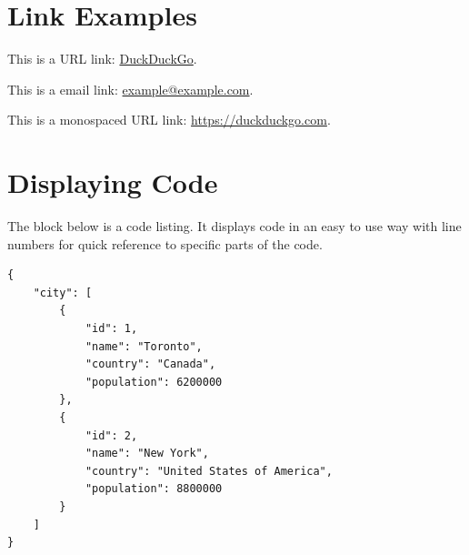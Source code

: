\documentclass[
	a4paper, %
	12pt, %
]{include/CSSullivanBusinessReport}
\begin{document}

\section{Link Examples}

This is a URL link: \href{https://www.duckduckgo.com}{DuckDuckGo}.

This is a email link: \href{mailto:example@example.com}{example@example.com}.

This is a monospaced URL link: \url{https://duckduckgo.com}.



\section{Displaying Code}

The block below is a code listing. It displays code in an easy to use way with line numbers for quick reference to specific parts of the code.

\begin{lstlisting}
{
	"city": [
		{
			"id": 1,
			"name": "Toronto",
			"country": "Canada",
			"population": 6200000
		},
		{
			"id": 2,
			"name": "New York",
			"country": "United States of America",
			"population": 8800000
		}
	]
}
\end{lstlisting}


\newpage


\begin{twothirdswidth} %
	\printbibliography[title=Reference List] %
\end{twothirdswidth}
\end{document}
